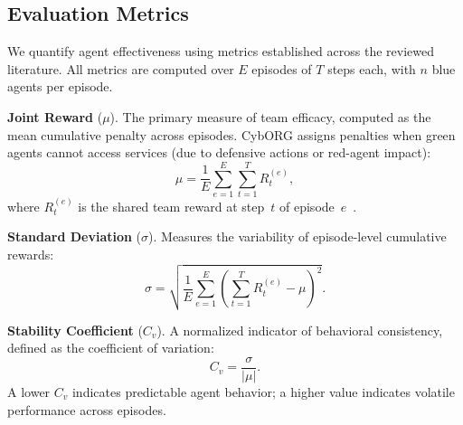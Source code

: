 %


\subsection{Evaluation Metrics}
We quantify agent effectiveness using metrics established across
the reviewed literature. All metrics are computed over $E$ episodes
of $T$ steps each, with $n$ blue agents per episode.

\textbf{Joint Reward} ($\mu$).
The primary measure of team efficacy, computed as the mean
cumulative penalty across episodes. CybORG assigns penalties
when green agents cannot access services
(due to defensive actions or red-agent impact):
\begin{equation}
\label{eq:joint_reward}
  \mu = \frac{1}{E}\sum_{e=1}^{E}\sum_{t=1}^{T} R_t^{(e)},
\end{equation}
where $R_t^{(e)}$ is the shared team reward at step~$t$ of
episode~$e$~\cite{arXiv:2505.04843v2}.

\textbf{Standard Deviation} ($\sigma$).
Measures the variability of episode-level cumulative rewards:
\begin{equation}
\label{eq:sigma}
  \sigma = \sqrt{
    \frac{1}{E}\sum_{e=1}^{E}
    \left(\sum_{t=1}^{T} R_t^{(e)} - \mu\right)^{\!2}
  }.
\end{equation}

\textbf{Stability Coefficient} ($C_v$).
A normalized indicator of behavioral consistency, defined as
the coefficient of variation:
\begin{equation}
\label{eq:stability}
  C_v = \frac{\sigma}{|\mu|}.
\end{equation}
A lower $C_v$ indicates predictable agent behavior; a higher
value indicates volatile performance across episodes.

